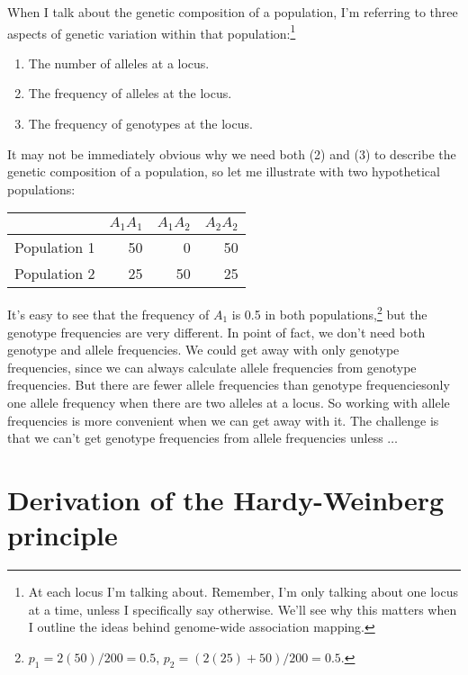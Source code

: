 \documentclass[12pt]{article}
\begin{document}
When I talk about the genetic composition of a population, I'm
referring to three aspects of genetic variation within that
population:\footnote{At each locus I'm talking about. Remember, I'm
  only talking about one locus at a time, unless I specifically say
  otherwise. We'll see why this matters when I outline the ideas
  behind genome-wide association mapping.} 
\begin{enumerate}

\item The number of alleles at a locus.

\item The frequency of alleles at the locus.

\item The frequency of genotypes at the locus.

\end{enumerate}
It may not be immediately obvious why we need both (2) and
(3) to describe the genetic composition of a population, so let me
illustrate with two hypothetical populations:
\begin{center}
\begin{tabular}{lrrr}
             & $A_1A_1$ & $A_1A_2$ & $A_2A_2$ \\
\hline\hline
Population 1 &       50 &        0 &       50 \\
Population 2 &       25 &       50 &       25 \\
\hline
\end{tabular}
\end{center}
It's easy to see that the frequency of $A_1$ is 0.5 in both
populations,\footnote{$p_1 = 2(50)/200 = 0.5$,
  $p_2 = (2(25) + 50)/200 = 0.5$.} but the genotype frequencies are
very different. In point of fact, we don't need both genotype and
allele frequencies. We could get away with only genotype frequencies,
since we can always calculate allele frequencies from genotype
frequencies. But there are fewer allele frequencies than genotype
frequencies{\dash}only one allele frequency when there are two alleles
at a locus. So working with allele frequencies is more convenient when
we can get away with it. The challenge is that we can't get genotype
frequencies from allele frequencies unless $\dots$

\section*{Derivation of the Hardy-Weinberg principle}
\end{document}
